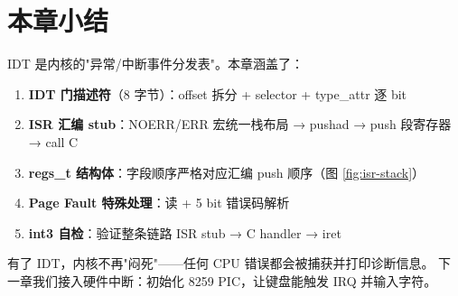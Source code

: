 \section{本章小结}

IDT 是内核的"异常/中断事件分发表"。本章涵盖了：

\begin{enumerate}
  \item \textbf{IDT 门描述符}（8 字节）：offset 拆分 + selector + type\_attr 逐 bit
  \item \textbf{ISR 汇编 stub}：NOERR/ERR 宏统一栈布局 → pushad → push 段寄存器 → call C
  \item \textbf{regs\_t 结构体}：字段顺序严格对应汇编 push 顺序（图 \ref{fig:isr-stack}）
  \item \textbf{Page Fault 特殊处理}：读  + 5 bit 错误码解析
  \item \textbf{int3 自检}：验证整条链路 ISR stub → C handler → iret
\end{enumerate}

有了 IDT，内核不再"闷死"——任何 CPU 错误都会被捕获并打印诊断信息。
下一章我们接入硬件中断：初始化 8259 PIC，让键盘能触发 IRQ 并输入字符。

